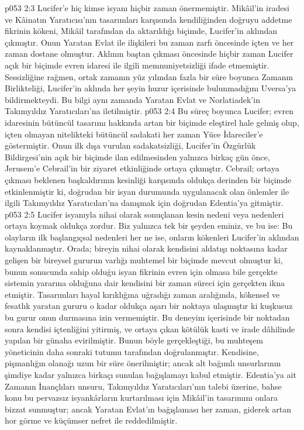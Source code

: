 \vs p053 2:3 Lucifer’e hiç kimse isyanı hiçbir zaman önermemiştir. Mikâil’in iradesi ve Kâinatın Yaratıcısı’nın tasarımları karşısında kendiliğinden doğruyu addetme fikrinin kökeni, Mikâil tarafından da aktarıldığı biçimde, Lucifer’in aklından çıkmıştır. Onun Yaratan Evlat ile ilişkileri bu zaman zarfı öncesinde içten ve her zaman dostane olmuştur. Aklının baştan çıkması öncesinde hiçbir zaman Lucifer açık bir biçimde evren idaresi ile ilgili memnuniyetsizliği ifade etmemiştir. Sessizliğine rağmen, ortak zamanın yüz yılından fazla bir süre boyunca Zamanın Birlikteliği, Lucifer’in aklında her şeyin huzur içerisinde bulunmadığını Uversa’ya bildirmekteydi. Bu bilgi aynı zamanda Yaratan Evlat ve Norlatiadek’in Takımyıldız Yaratıcıları’na iletilmiştir.
\vs p053 2:4 Bu süreç boyunca Lucifer; evren idaresinin bütüncül tasarımı hakkında artan bir biçimde eleştirel hale gelmiş olup, içten olmayan nitelikteki bütüncül sadakati her zaman Yüce İdareciler’e göstermiştir. Onun ilk dışa vurulan sadakatsizliği, Lucifer’in Özgürlük Bildirgesi’nin açık bir biçimde ilan edilmesinden yalnızca birkaç gün önce, Jerusem’e Cebrail’in bir ziyaret etkinliğinde ortaya çıkmıştır. Cebrail; ortaya çıkması beklenen başkaldırının kesinliği karşısında oldukça derinden bir biçimde etkinlenmiştir ki, doğrudan bir isyan durumunda uygulanacak olan önlemler ile ilgili Takımyıldız Yaratıcıları’na danışmak için doğrudan Edentia’ya gitmiştir.
\vs p053 2:5 Lucifer isyanıyla nihai olarak sonuçlanan kesin nedeni veya nedenleri ortaya koymak oldukça zordur. Biz yalnızca tek bir şeyden eminiz, ve bu ise: Bu olayların ilk başlangıçsal nedenleri her ne ise, onların kökenleri Lucifer’in aklından kaynaklanmıştır. Orada; bireyin nihai olarak kendisini aldatışı noktasına kadar gelişen bir bireysel gururun varlığı muhtemel bir biçimde mevcut olmuştur ki, bunun sonucunda sahip olduğu isyan fikrinin evren için olmasa bile gerçekte sistemin yararına olduğuna dair kendisini bir zaman süreci için gerçekten ikna etmiştir. Tasarımları hayal kırıklığına uğradığı zaman aralığında, kökensel ve fesatlık yaratan gururu o kadar oldukça aşarı bir noktaya ulaşmıştır ki kuşkusuz bu gurur onun durmasına izin vermemiştir. Bu deneyim içerisinde bir noktadan sonra kendisi içtenliğini yitirmiş, ve ortaya çıkan kötülük kasti ve irade dâhilinde yapılan bir günaha evirilmiştir. Bunun böyle gerçekleştiği, bu muhteşem yöneticinin daha sonraki tutumu tarafından doğrulanmıştır. Kendisine, pişmanlığın olanağı uzun bir süre önerilmiştir; ancak alt bağımlı unsurlarının şimdiye kadar yalnızca birkaçı sunulan bağışlamayı kabul etmiştir. Edentia’ya ait Zamanın İnançlıları unsuru, Takımyıldız Yaratıcıları’nın talebi üzerine, bahse konu bu pervazsız isyankârların kurtarılması için Mikâil’in tasarımını onlara bizzat sunmuştur; ancak Yaratan Evlat’ın bağışlaması her zaman, giderek artan hor görme ve küçümser nefret ile reddedilmiştir.
